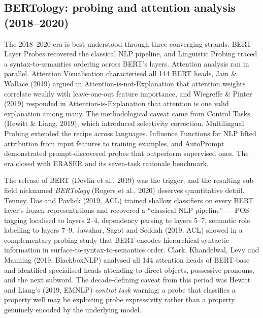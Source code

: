 \documentclass{article}
\begin{document}
\subsection{BERTology: probing and attention analysis (2018--2020)}\label{bertology-probing-and-attention-analysis-20182020}

The 2018--2020 era is best understood through three converging strands. BERT-Layer Probes \citep{tenney2019bertrediscoversthe} recovered the classical NLP pipeline, and Linguistic Probing \citep{jawahar2019whatdoesbertlearna} traced a syntax-to-semantics ordering across BERT's layers. Attention analysis ran in parallel. Attention Visualisation \citep{clark2019whatdoesbertlookat} characterised all 144 BERT heads, Jain \& Wallace (2019) argued in Attention-is-not-Explanation that attention weights correlate weakly with leave-one-out feature importance, and Wiegreffe \& Pinter (2019) responded in Attention-is-Explanation that attention is one valid explanation among many. The methodological caveat came from Control Tasks (Hewitt \& Liang, 2019), which introduced selectivity correction. Multilingual Probing \citep{ravishankar2019multilingualprobin} extended the recipe across languages. Influence Functions for NLP \citep{han2020explainingblackbox} lifted attribution from input features to training examples, and AutoPrompt \citep{shin2020autopromptelicitin} demonstrated prompt-discovered probes that outperform supervised ones. The era closed with ERASER \citep{deyoung2020eraserabenchmarkto} and its seven-task rationale benchmark.

The release of BERT (Devlin et al., 2019) was the trigger, and the resulting sub-field nicknamed \emph{BERTology} (Rogers et al., 2020) deserves quantitative detail. Tenney, Das and Pavlick (2019, ACL) trained shallow classifiers on every BERT layer's frozen representations and recovered a ``classical NLP pipeline'' --- POS tagging localised to layers 2--4, dependency parsing to layers 5--7, semantic role labelling to layers 7--9. Jawahar, Sagot and Seddah (2019, ACL) showed in a complementary probing study that BERT encodes hierarchical syntactic information in surface-to-syntax-to-semantics order. Clark, Khandelwal, Levy and Manning (2019, BlackboxNLP) analysed all 144 attention heads of BERT-base and identified specialised heads attending to direct objects, possessive pronouns, and the next subword. The decade-defining caveat from this period was Hewitt and Liang's (2019, EMNLP) \emph{control task} warning: a probe that classifies a property well may be exploiting probe expressivity rather than a property genuinely encoded by the underlying model.
\end{document}
